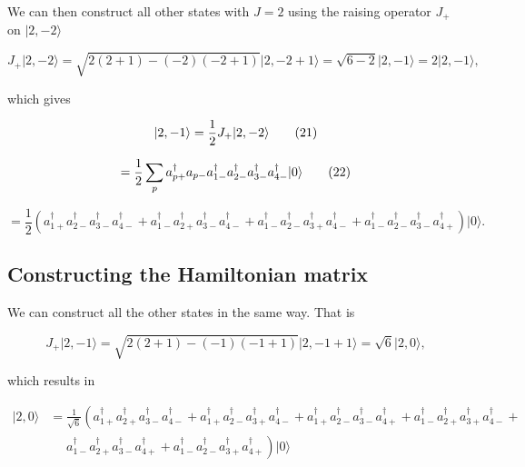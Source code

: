 \documentclass[11pt]{article}
\begin{document}
We can then construct all other states with \(J=2\) using the raising
operator \(J_+\) on \(\vert 2,-2\rangle\)

    \[
J_+ \vert 2,-2\rangle = \sqrt{2(2+1) - (-2)(-2+1)} \vert 2,-2+1\rangle =\sqrt{6 - 2} \vert 2,-1\rangle = 2\vert 2,-1\rangle,
\]

    which gives

    \hypertarget{_auto1}{}

\[
\begin{equation}
\vert 2,-1\rangle = \frac{1}{2} J_+ \vert 2,-2\rangle \notag 
\label{_auto1} \tag{21}
\end{equation}
\]

    \hypertarget{_auto2}{}

\[
\begin{equation} 
= \frac{1}{2} \sum_p a_{p+}^\dagger a_{p-} a_{1-}^{\dagger} a_{2-}^{\dagger}
a_{3-}^{\dagger} a_{4-}^{\dagger} \vert 0\rangle \notag 
\label{_auto2} \tag{22}
\end{equation}
\]

    \hypertarget{eq:2ux2c-1}{}

\[
\begin{equation} 
= \frac{1}{2} \left(
a_{1+}^{\dagger} a_{2-}^{\dagger} a_{3-}^{\dagger} a_{4-}^{\dagger} +
a_{1-}^{\dagger} a_{2+}^{\dagger} a_{3-}^{\dagger} a_{4-}^{\dagger} +
a_{1-}^{\dagger} a_{2-}^{\dagger} a_{3+}^{\dagger} a_{4-}^{\dagger} +
a_{1-}^{\dagger} a_{2-}^{\dagger} a_{3-}^{\dagger} a_{4+}^{\dagger}
\right) \vert 0\rangle. \label{eq:2,-1} \tag{23}
\end{equation}
\]

    \hypertarget{constructing-the-hamiltonian-matrix}{%
\subsection{Constructing the Hamiltonian
matrix}\label{constructing-the-hamiltonian-matrix}}

We can construct all the other states in the same way. That is

    \[
J_+ \vert 2,-1\rangle = \sqrt{2(2+1) - (-1)(-1+1)} \vert 2,-1+1\rangle = \sqrt{6} \vert 2,0\rangle,
\]

    which results in

    \hypertarget{eq:2ux2c0}{}

\[
\begin{equation}
\begin{aligned}
\vert 2,0\rangle &= \frac{1}{\sqrt{6}} \left(
a_{1+}^{\dagger} a_{2+}^{\dagger} a_{3-}^{\dagger} a_{4-}^{\dagger} +
a_{1+}^{\dagger} a_{2-}^{\dagger} a_{3+}^{\dagger} a_{4-}^{\dagger} +
a_{1+}^{\dagger} a_{2-}^{\dagger} a_{3-}^{\dagger} a_{4+}^{\dagger} +
a_{1-}^{\dagger} a_{2+}^{\dagger} a_{3+}^{\dagger} a_{4-}^{\dagger} + \right. \\
&\quad\,\, \left.
a_{1-}^{\dagger} a_{2+}^{\dagger} a_{3-}^{\dagger} a_{4+}^{\dagger} +
a_{1-}^{\dagger} a_{2-}^{\dagger} a_{3+}^{\dagger} a_{4+}^{\dagger} \right) \vert 0\rangle
\end{aligned}
\label{eq:2,0} \tag{24}
\end{equation}
\]
\end{document}
